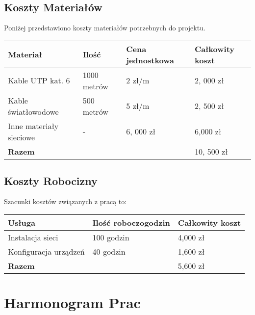     \subsection{Koszty Materiałów}
        Poniżej przedstawiono koszty materiałów potrzebnych do projektu.

        \begin{flushleft}
            \renewcommand{\arraystretch}{1.5}
            \begin{tabular}{|l|l|l|l|}
                \hline
                    \textbf{Materiał} & \textbf{Ilość} & \textbf{Cena jednostkowa} & \textbf{Całkowity koszt} \\
                \hline
                    Kable UTP kat. 6 & 1000 metrów & 2 zł/m & 2, 000 zł \\
                    Kable światłowodowe & 500 metrów & 5 zł/m & 2, 500 zł \\
                    Inne materiały sieciowe & - & 6, 000 zł & 6,000 zł \\
                \hline
                    \textbf{Razem} & & & 10, 500 zł \\
                \hline
            \end{tabular}
        \end{flushleft}

    \subsection{Koszty Robocizny}
        Szacunki kosztów związanych z pracą to:

        \begin{flushleft}
            \renewcommand{\arraystretch}{1.5}
            \begin{tabular}{|l|l|l|}
            \hline
                \textbf{Usługa} & \textbf{Ilość roboczogodzin} & \textbf{Całkowity koszt} \\
            \hline
                Instalacja sieci & 100 godzin & 4,000 zł \\
                Konfiguracja urządzeń & 40 godzin & 1,600 zł \\
            \hline
                \textbf{Razem} & & 5,600 zł \\
            \hline
            \end{tabular}
        \end{flushleft}

\section{Harmonogram Prac}

